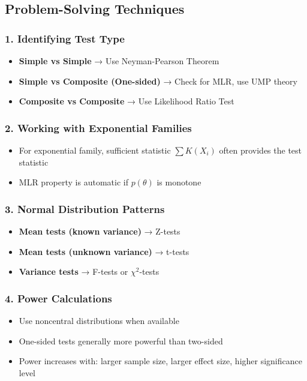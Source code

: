 \subsection{Problem-Solving Techniques}

\subsubsection{1. Identifying Test Type}

\begin{itemize}
	\item \textbf{Simple vs Simple} → Use Neyman-Pearson Theorem
	\item \textbf{Simple vs Composite (One-sided)} → Check for MLR, use UMP theory
	\item \textbf{Composite vs Composite} → Use Likelihood Ratio Test
\end{itemize}

\subsubsection{2. Working with Exponential Families}

\begin{itemize}
	\item For exponential family, sufficient statistic $\sum K(X_i)$ often provides the test statistic
	\item MLR property is automatic if $p(\theta)$ is monotone
\end{itemize}

\subsubsection{3. Normal Distribution Patterns}

\begin{itemize}
	\item \textbf{Mean tests (known variance)} → Z-tests
	\item \textbf{Mean tests (unknown variance)} → t-tests
	\item \textbf{Variance tests} → F-tests or $\chi^2$-tests
\end{itemize}

\subsubsection{4. Power Calculations}

\begin{itemize}
	\item Use noncentral distributions when available
	\item One-sided tests generally more powerful than two-sided
	\item Power increases with: larger sample size, larger effect size, higher significance level
\end{itemize}

